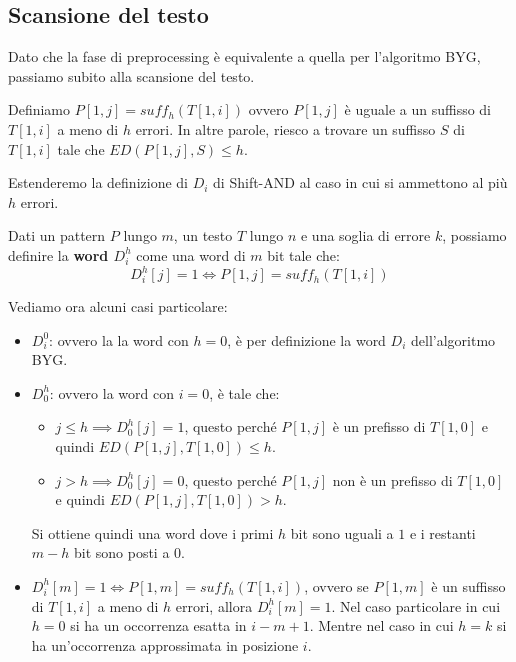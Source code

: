 \subsection{Scansione del testo}
Dato che la fase di preprocessing è equivalente a quella per l'algoritmo BYG,
passiamo subito alla scansione del testo.
\begin{definizione}
    Definiamo $P[1, j] = suff_h(T[1, i])$ ovvero $P[1, j]$ è uguale a un
    suffisso di $T[1, i]$ a meno di $h$ errori. In altre parole, riesco a
    trovare un suffisso $S$ di $T[1, i]$ tale che $ED(P[1, j], S) \leq h$.
\end{definizione}
Estenderemo la definizione di $D_i$ di Shift-AND al caso in cui si ammettono al
più $h$ errori.
\begin{definizione}
    Dati un pattern $P$ lungo $m$, un testo $T$ lungo $n$ e una soglia di errore
    $k$, possiamo definire la \textbf{word $D_i^h$} come una word di $m$ bit
    tale che:
    \begin{equation}
        D_i^h[j] = 1 \iff P[1, j] = suff_h(T[1, i])
    \end{equation}
\end{definizione}
Vediamo ora alcuni casi particolare:
\begin{itemize}
    \item $D_i^0$: ovvero la la word con $h = 0$, è per definizione la word
          $D_i$ dell'algoritmo BYG.
    \item $D_0^h$: ovvero la word con $i = 0$, è tale che:
          \begin{itemize}
              \item $j \leq h \implies D_0^h[j] = 1$, questo perché $P[1, j]$ è
                    un prefisso di $T[1, 0]$ e quindi $ED(P[1, j], T[1, 0])
                        \leq h$.
              \item $j > h \implies D_0^h[j] = 0$, questo perché $P[1, j]$ non
                    è un prefisso di $T[1, 0]$ e quindi $ED(P[1, j], T[1, 0]) >
                        h$.
          \end{itemize}
          Si ottiene quindi una word dove i primi $h$ bit sono uguali a $1$ e i
          restanti $m - h$ bit sono posti a $0$.
    \item $D_i^h [m] = 1 \iff P[1, m] = suff_h(T[1, i])$, ovvero se $P[1, m]$ è
          un suffisso di $T[1, i]$ a meno di $h$ errori, allora $D_i^h[m] = 1$.
          Nel caso particolare in cui $h = 0$ si ha un occorrenza esatta in $i -
              m + 1$. Mentre nel caso in cui $h = k$ si ha un'occorrenza
          approssimata in posizione $i$.
\end{itemize}
